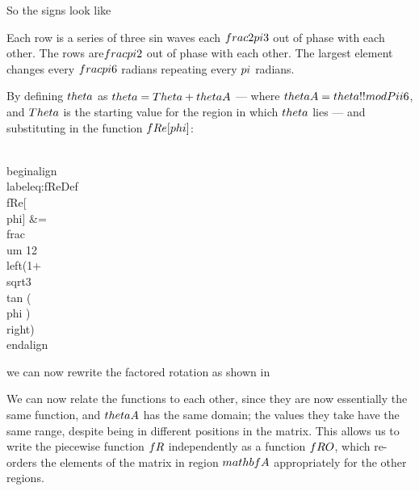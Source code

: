 So the signs look like


Each row is a series of three sin waves each $\\frac{2\\pi}{3}$ out of phase with each other. The rows are$\\frac{\\pi}{2}$ out of phase with each other.
The largest element changes every $\\frac{\\pi}{6}$ radians repeating every $\\pi$ radians.

By defining $\\theta$ as $\\theta  = \\Theta + \\thetaA$ --- where $\\thetaA = \\theta \\!\\!\\mod \\Pii{6}$, and $\\Theta$ is the starting value for the region in which $\\theta$ lies --- and substituting in the function $\\fRe[\\phi] $:

\\begin{align}\\label{eq:fReDef}
\\fRe[\\phi] &= \\frac{\\um 1}{2} \\left(1+\\sqrt{3} \\tan (\\phi )\\right) 
\\end{align}

we can now rewrite the factored rotation as shown in 


We can now relate the functions to each other, since they are now essentially the same function, and $\\thetaA$ has the same domain; the values they take have the same range, despite being in different positions in the matrix. This allows us to write the piecewise function $\\fR$ independently as a function $\\fRO$, which re-orders the elements of the matrix in region $\\mathbf{A}$ appropriately for the other regions.

